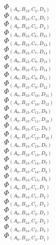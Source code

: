 \documentclass[14pt]{article}
\begin{document}
    $\Phi_{({A}_{8}, {B}_{13}, {C}_{3}, {D}_{3})}$ \\ 
    $\Phi_{({A}_{8}, {B}_{13}, {C}_{4}, {D}_{5})}$ \\ 
    $\Phi_{({A}_{8}, {B}_{13}, {C}_{5}, {D}_{4})}$ \\ 
    $\Phi_{({A}_{8}, {B}_{13}, {C}_{6}, {D}_{15})}$ \\ 
    $\Phi_{({A}_{8}, {B}_{13}, {C}_{7}, {D}_{13})}$ \\ 
    $\Phi_{({A}_{8}, {B}_{13}, {C}_{7}, {D}_{14})}$ \\ 
    $\Phi_{({A}_{8}, {B}_{13}, {C}_{8}, {D}_{13})}$ \\ 
    $\Phi_{({A}_{8}, {B}_{13}, {C}_{8}, {D}_{14})}$ \\ 
    $\Phi_{({A}_{8}, {B}_{13}, {C}_{9}, {D}_{11})}$ \\ 
    $\Phi_{({A}_{8}, {B}_{13}, {C}_{9}, {D}_{12})}$ \\ 
    $\Phi_{({A}_{8}, {B}_{13}, {C}_{10}, {D}_{11})}$ \\ 
    $\Phi_{({A}_{8}, {B}_{13}, {C}_{10}, {D}_{12})}$ \\ 
    $\Phi_{({A}_{8}, {B}_{13}, {C}_{11}, {D}_{9})}$ \\ 
    $\Phi_{({A}_{8}, {B}_{13}, {C}_{11}, {D}_{10})}$ \\ 
    $\Phi_{({A}_{8}, {B}_{13}, {C}_{12}, {D}_{9})}$ \\ 
    $\Phi_{({A}_{8}, {B}_{13}, {C}_{12}, {D}_{10})}$ \\ 
    $\Phi_{({A}_{8}, {B}_{13}, {C}_{13}, {D}_{7})}$ \\ 
    $\Phi_{({A}_{8}, {B}_{13}, {C}_{13}, {D}_{8})}$ \\ 
    $\Phi_{({A}_{8}, {B}_{13}, {C}_{14}, {D}_{7})}$ \\ 
    $\Phi_{({A}_{8}, {B}_{13}, {C}_{14}, {D}_{8})}$ \\ 
    $\Phi_{({A}_{8}, {B}_{13}, {C}_{15}, {D}_{6})}$ \\ 
    $\Phi_{({A}_{8}, {B}_{14}, {C}_{1}, {D}_{1})}$ \\ 
    $\Phi_{({A}_{8}, {B}_{14}, {C}_{1}, {D}_{2})}$ \\ 
    $\Phi_{({A}_{8}, {B}_{14}, {C}_{1}, {D}_{3})}$ \\ 
    $\Phi_{({A}_{8}, {B}_{14}, {C}_{2}, {D}_{1})}$ \\ 
    $\Phi_{({A}_{8}, {B}_{14}, {C}_{2}, {D}_{2})}$ \\ 
    $\Phi_{({A}_{8}, {B}_{14}, {C}_{2}, {D}_{3})}$ \\ 
    $\Phi_{({A}_{8}, {B}_{14}, {C}_{3}, {D}_{1})}$ \\ 
\end{document}
